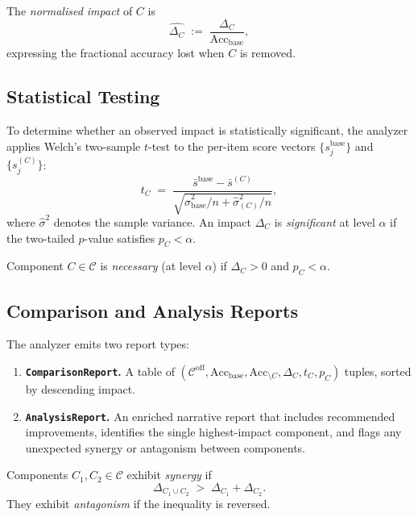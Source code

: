 \documentclass[11pt]{article}
\newcommand{\Acc}{\mathrm{Acc}}             %
\newcommand{\AccBase}{\Acc_{\mathrm{base}}} %
\newcommand{\AccAbl}[1]{\Acc_{\setminus #1}}%
\newcommand{\Impact}[1]{\Delta_{\!#1}}      %
\newcommand{\CompSet}{\mathcal{C}}          %
\begin{document}
\begin{definition}
\label{def:norm-impact}
The \emph{normalised impact} of $C$ is
\[
  \hat{\Impact{C}} \;:=\; \frac{\Impact{C}}{\AccBase},
\]
expressing the fractional accuracy lost when $C$ is removed.
\end{definition}

\subsection{Statistical Testing}
\label{subsec:stat-test}

To determine whether an observed impact is statistically significant,
the analyzer applies Welch's two-sample $t$-test to the per-item
score vectors $\{s^{\mathrm{base}}_j\}$ and $\{s^{(C)}_j\}$:
\[
  t_C \;=\; \frac{\bar{s}^{\mathrm{base}} - \bar{s}^{(C)}}
                 {\sqrt{\hat{\sigma}^2_{\mathrm{base}} / n
                      + \hat{\sigma}^2_{(C)} / n}},
\]
where $\hat{\sigma}^2$ denotes the sample variance.  An impact
$\Impact{C}$ is \emph{significant} at level $\alpha$ if the
two-tailed $p$-value satisfies $p_C < \alpha$.

\begin{definition}
\label{def:necessary}
Component $C \in \CompSet$ is \emph{necessary} (at level $\alpha$) if
$\Impact{C} > 0$ and $p_C < \alpha$.
\end{definition}

\subsection{Comparison and Analysis Reports}
\label{subsec:reports}

The analyzer emits two report types:

\begin{enumerate}
\item \textbf{\texttt{ComparisonReport}.}  A table of
  $(\CompSet^{\mathrm{off}}, \AccBase, \AccAbl{C}, \Impact{C},
  t_C, p_C)$ tuples, sorted by descending impact.

\item \textbf{\texttt{AnalysisReport}.}  An enriched narrative report
  that includes recommended improvements, identifies the single
  highest-impact component, and flags any unexpected synergy or
  antagonism between components.
\end{enumerate}

\begin{definition}[Synergy]
\label{def:synergy}
Components $C_1, C_2 \in \CompSet$ exhibit \emph{synergy} if
\[
  \Impact{C_1 \cup C_2} \;>\; \Impact{C_1} + \Impact{C_2}.
\]
They exhibit \emph{antagonism} if the inequality is reversed.
\end{definition}
\end{document}
